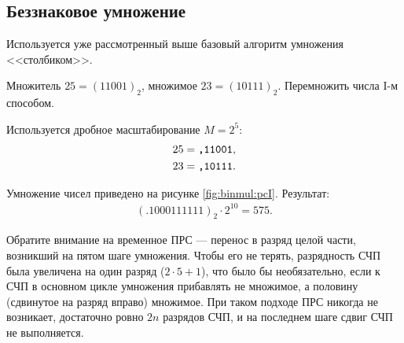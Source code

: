 \subsection{Беззнаковое умножение}
\label{ch:mult:sct:pc}

Используется уже рассмотренный выше базовый алгоритм умножения <<столбиком>>.
\begin{Example}\label{ex:binmul:pcI}
    Множитель $25=(11001)_2$, множимое $23=(10111)_2$. Перемножить числа I-м способом.
\end{Example}
\begin{Solve}
    Используется дробное масштабирование $M=2^5$:
    \begin{align*}
        25=\texttt{,11001},\\
        23=\texttt{,10111}.
    \end{align*}

    Умножение чисел приведено на рисунке \ref{fig:binmul:pcI}. Результат: 
    \begin{align*}
        (.1000111111)_2\cdot 2^{10}=575.
    \end{align*}
    
    Обратите внимание на временное ПРС --- перенос в разряд целой части, возникший на пятом шаге умножения. Чтобы его не терять, разрядность СЧП была увеличена на один разряд ($2\cdot5+1$), что было бы необязательно, если к СЧП в основном цикле умножения прибавлять не множимое, а половину (сдвинутое на разряд вправо) множимое. При таком подходе ПРС никогда не возникает, достаточно ровно $2n$ разрядов СЧП, и на последнем шаге сдвиг СЧП не выполняется.
\end{Solve}

